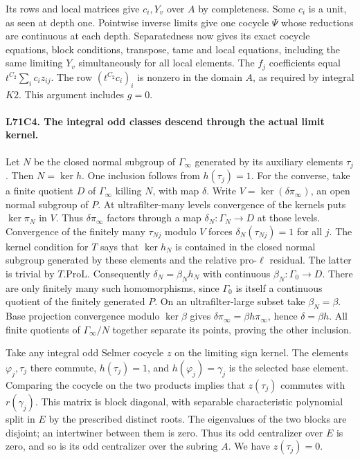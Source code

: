 Its rows and local matrices give $c_i,Y_v$ over $A$ by completeness.
Some $c_i$ is a unit, as seen at depth one. Pointwise inverse
limits give one cocycle $\Psi$ whose reductions are continuous
at each depth. Separatedness now gives its exact cocycle equations,
block conditions, transpose, tame and local equations, including
the same limiting $Y_v$ simultaneously for all local elements.
The $f_j$ coefficients equal $t^{C_2}\sum_i c_i z_{ij}$.
The row $(t^{C_2}c_i)_i$ is nonzero in the domain $A$, as
required by integral $K2$. This argument includes $g=0$.

\paragraph{L71C4. The integral odd classes descend through the actual limit kernel.}
Let $N$ be the closed normal subgroup of $\Gamma_\infty$
generated by its auxiliary elements $\tau_j$. Then
$N=\ker h$. One inclusion follows from $h(\tau_j)=1$.
For the converse, take a finite quotient $D$ of $\Gamma_\infty$
killing $N$, with map $\delta$. Write
$V=\ker(\delta\pi_\infty)$, an open normal subgroup of $P$.
At ultrafilter-many levels convergence of the kernels puts
$\ker\pi_N$ in $V$. Thus $\delta\pi_\infty$ factors through
a map $\delta_N:\Gamma_N\to D$ at those levels. Convergence of
the finitely many $\tau_{Nj}$ modulo $V$ forces
$\delta_N(\tau_{Nj})=1$ for all $j$. The kernel condition for
$T$ says that $\ker h_N$ is contained in the closed normal
subgroup generated by these elements and the relative
pro-$\ell$ residual. The latter is trivial by $T.\mathrm{ProL}$.
Consequently $\delta_N=\beta_Nh_N$ with continuous
$\beta_N:\Gamma_0\to D$. There are only finitely many such
homomorphisms, since $\Gamma_0$ is itself a continuous quotient
of the finitely generated $P$. On an ultrafilter-large subset
take $\beta_N=\beta$. Base projection convergence modulo
$\ker\beta$ gives
$\delta\pi_\infty=\beta h\pi_\infty$, hence $\delta=\beta h$.
All finite quotients of $\Gamma_\infty/N$ together separate
its points, proving the other inclusion.

Take any integral odd Selmer cocycle $z$ on the limiting sign
kernel. The elements $\varphi_j,\tau_j$ there commute,
$h(\tau_j)=1$, and $h(\varphi_j)=\gamma_j$ is the selected
base element. Comparing the cocycle on the two products implies
that $z(\tau_j)$ commutes with $r(\gamma_j)$. This matrix is
block diagonal, with separable characteristic polynomial split
in $E$ by the prescribed distinct roots. The eigenvalues of the
two blocks are disjoint; an intertwiner between them is zero.
Thus its odd centralizer over $E$ is zero, and so is its odd
centralizer over the subring $A$. We have $z(\tau_j)=0$.

